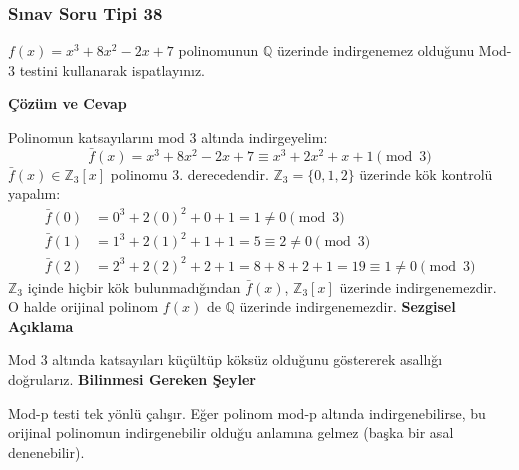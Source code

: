 \documentclass[11pt, a4paper]{article}
\newenvironment{cozum}{
    \vspace{0.5cm}
    \noindent\textcolor{green!60!black}{\faCheckCircle\enspace \textbf{\Large Çözüm ve Cevap}}\par\vspace{0.2cm}
}{}
\newenvironment{sezgisel}{
    \vspace{0.5cm}
    \noindent\textcolor{orange!80!black}{\faLightbulb\enspace \textbf{\Large Sezgisel Açıklama}}\par\vspace{0.2cm}
    \itshape
}{}
\newenvironment{bilgi}{
    \vspace{0.5cm}
    \noindent\textcolor{red!70!black}{\faExclamationTriangle\enspace \textbf{\Large Bilinmesi Gereken Şeyler}}\par\vspace{0.2cm}
}{}
\begin{document}
\subsubsection{Sınav Soru Tipi 38}
\begin{sinavbox}
$f(x) = x^3+8x^2-2x+7$ polinomunun $\mathbb{Q}$ üzerinde indirgenemez olduğunu Mod-3 testini kullanarak ispatlayınız.
\end{sinavbox}
\begin{cozum}
Polinomun katsayılarını mod 3 altında indirgeyelim:
\[ \bar{f}(x) = x^3 + 8x^2 - 2x + 7 \equiv x^3 + 2x^2 + x + 1 \pmod 3 \]
$\bar{f}(x) \in \mathbb{Z}_3[x]$ polinomu 3. derecedendir. $\mathbb{Z}_3 = \{0, 1, 2\}$ üzerinde kök kontrolü yapalım:
\begin{align*}
\bar{f}(0) &= 0^3 + 2(0)^2 + 0 + 1 = 1 \neq 0 \pmod 3 \\
\bar{f}(1) &= 1^3 + 2(1)^2 + 1 + 1 = 5 \equiv 2 \neq 0 \pmod 3 \\
\bar{f}(2) &= 2^3 + 2(2)^2 + 2 + 1 = 8 + 8 + 2 + 1 = 19 \equiv 1 \neq 0 \pmod 3
\end{align*}
$\mathbb{Z}_3$ içinde hiçbir kök bulunmadığından $\bar{f}(x)$, $\mathbb{Z}_3[x]$ üzerinde indirgenemezdir. O halde orijinal polinom $f(x)$ de $\mathbb{Q}$ üzerinde indirgenemezdir.
\end{cozum}
\begin{sezgisel}
Mod 3 altında katsayıları küçültüp köksüz olduğunu göstererek asallığı doğrularız.
\end{sezgisel}
\begin{bilgi}
Mod-p testi tek yönlü çalışır. Eğer polinom mod-p altında indirgenebilirse, bu orijinal polinomun indirgenebilir olduğu anlamına gelmez (başka bir asal denenebilir).
\end{bilgi}

\newpage
\end{document}

